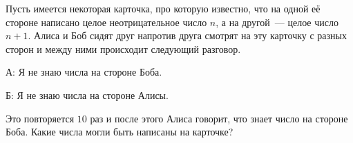 Пусть имеется некоторая карточка, про которую известно, что на одной её стороне написано целое
неотрицательное число $n$, а на другой~--- целое число $n + 1$. Алиса и Боб сидят друг напротив друга
смотрят на эту карточку с разных сторон и между ними происходит следующий разговор.
\begin{itemtask}
    \item[А:] Я не знаю числа на стороне Боба.
    \item[Б:] Я не знаю числа на стороне Алисы.
\end{itemtask}
Это повторяется $10$ раз и после этого Алиса говорит, что знает число на стороне Боба. Какие числа могли
быть написаны на карточке?